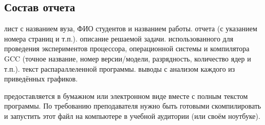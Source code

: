 { %
	\subsection{Состав отчета}
	\begin{enumerate}
		 лист с названием вуза, ФИО студентов и названием работы.
		 отчета (с указанием номера страниц и т.п.).
		 описание решаемой задачи.
		 использованного для проведения экспериментов  процессора, операционной системы и компилятора GCC  (точное название, номер версии/модели, разрядность, количество ядер и т.п.).
		 текст распараллеленной программы.
		 выводы с анализом каждого из приведённых графиков.
	\end{enumerate}
	 предоставляется в бумажном или электронном виде вместе с полным текстом программы. По требованию преподавателя нужно быть готовыми скомпилировать и запустить этот файл на компьютере в учебной аудитории (или своём ноутбуке).
	\par
}